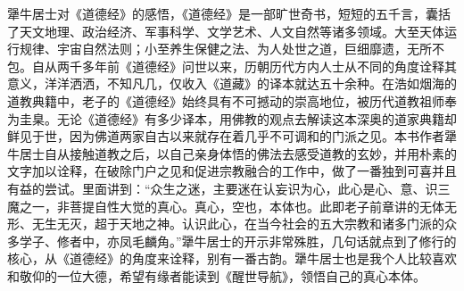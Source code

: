 \begin{book}[《醒世导航》]
    犟牛居士对《道德经》的感悟，《道德经》是一部旷世奇书，短短的五千言，囊括了天文地理、政治经济、军事科学、文学艺术、人文自然等诸多领域。大至天体运行规律、宇宙自然法则；小至养生保健之法、为人处世之道，巨细靡遗，无所不包。自从两千多年前《道德经》问世以来，历朝历代方内人士从不同的角度诠释其意义，洋洋洒洒，不知凡几，仅收入《道藏》的译本就达五十余种。在浩如烟海的道教典籍中，老子的《道德经》始终具有不可撼动的崇高地位，被历代道教祖师奉为圭臬。无论《道德经》有多少译本，用佛教的观点去解读这本深奥的道家典籍却鲜见于世，因为佛道两家自古以来就存在着几乎不可调和的门派之见。本书作者犟牛居士自从接触道教之后，以自己亲身体悟的佛法去感受道教的玄妙，并用朴素的文字加以诠释，在破除门户之见和促进宗教融合的工作中，做了一番独到可喜并且有益的尝试。里面讲到：“众生之迷，主要迷在认妄识为心，此心是心、意、识三魔之一，非菩提自性大觉的真心。真心，空也，本体也。此即老子前章讲的无体无形、无生无灭，超于天地之神。认识此心，在当今社会的五大宗教和诸多门派的众多学子、修者中，亦凤毛麟角。”犟牛居士的开示非常殊胜，几句话就点到了修行的核心，从《道德经》的角度来诠释，别有一番古韵。犟牛居士也是我个人比较喜欢和敬仰的一位大德，希望有缘者能读到《醒世导航》，领悟自己的真心本体。
\end{book}
